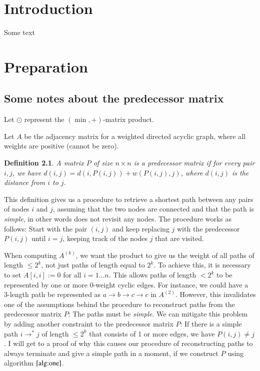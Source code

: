 \documentclass[a4paper,12pt,oneside,openright]{report}
\newtheorem{definition}{Definition}
\begin{document}
\pagestyle{empty}
\singlespacing

\onehalfspacing



\singlespacing
{}
\setcounter{page}{0}
\pagestyle{plain}
\tableofcontents
\listoffigures
\listoftables

\onehalfspacing


\chapter{Introduction}
\setcounter{page}{1}

Some text
\chapter{Preparation}

\section{Some notes about the predecessor matrix}%
\label{sec:Some notes about the predecessor matrix}

Let $\odot$ represent the $(\min, +)$-matrix product.

Let $A$ be the adjacency matrix for a weighted directed acyclic graph, where all weights
are positive (cannot be zero).

\begin{definition}
    A matrix $P$ of size $n \times n$ is a \textit{predecessor matrix} if for
    every pair $i,j$, we have $d(i,j)=d(i,P(i,j))+w(P(i,j),j)$,
    where $d(i,j)$ is the distance from $i$ to $j$.
\end{definition}

This definition gives us a procedure to retrieve a shortest path between any pairs
of nodes $i$ and $j$, assuming that the two nodes are connected and that the path
is \textit{simple}, in other words does not revisit any nodes. The procedure works
as follows: Start with the pair $(i, j)$ and keep replacing $j$ with the predecessor
$P(i, j)$ until $i = j$, keeping track of the nodes $j$ that are visited.

When computing $A^{(k)}$, we want the product to give us the weight of all paths of
length $\leq 2^{k}$, not just paths of length equal to $2^k$. To achieve this, it is
necessary to set $A[i,i]:=0$ for all $i=1\dots n$. This allows paths of length
$< 2^k$ to be represented by one or more 0-weight cyclic edges. For instance, we could
have a 3-length path be represented as $a \rightarrow b \rightarrow c \rightarrow c$ in
$A^{(2)}$. However, this invalidates one of the assumptions behind the 
procedure to reconstruct paths from the predecessor matrix
$P$: The paths must be \textit{simple}. We can mitigate this problem by adding another
constraint to the predecessor matrix $P$: If there is a simple path $i \rightarrow^* j$
of length $\leq 2^k$ that consists of 1 or more edges, we have $P(i,j)\neq j$.
I will get to a proof of why this causes our procedure of reconstructing paths
to always terminate and give a simple path in a moment, if we construct $P$ using
algorithm $\ref{alg:one}$.
\end{document}
